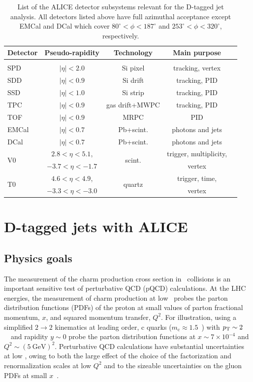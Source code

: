 \documentclass[12pt, a4paper, twoside, titlepage]{article}
\begin{document}
\begin{table}[bt]
\centering
\begin{tabular}{lcccc}
Detector		& Pseudo-rapidity		& Technology			& Main purpose			\\
\hline 
\hline
\\
SPD			& $\lvert \eta\rvert <2.0$	& Si pixel				& tracking, vertex		\\
SDD			& $\lvert \eta\rvert <0.9$ 	& Si drift				& tracking, PID			\\
SSD			& $\lvert \eta\rvert <1.0$ 	& Si strip				& tracking, PID			\\
TPC 			& $\lvert \eta\rvert <0.9$ 	& gas drift+MWPC		& tracking, PID			\\
TOF			& $\lvert \eta\rvert <0.9$	& MRPC				& PID				\\
EMCal		& $\lvert \eta\rvert <0.7$ 	& Pb+scint. 			& photons and jets		\\
DCal			& $\lvert \eta\rvert <0.7$ 	& Pb+scint. 			& photons and jets		\\
\multirow{2}{*}{V0}& $2.8 <\eta< 5.1$,	&\multirow{2}{*}{scint.}	& trigger, multiplicity,		\\
			& $-3.7 <\eta<-1.7$		&					& vertex				\\
\multirow{2}{*}{T0}& $4.6 <\eta< 4.9$,	&\multirow{2}{*}{quartz}	& trigger, time,			\\
			& $-3.3 <\eta<-3.0$		&					& vertex				\\
\end{tabular}
\caption{List of the ALICE detector subsystems relevant for the D-tagged jet analysis. All detectors listed above have full azimuthal acceptance except EMCal and DCal 
which cover $80^{\circ} <\phi< 187^{\circ}$ and $253^{\circ} <\phi< 320^{\circ}$, respectively.
\label{tab:ALICEdetectors}}
\end{table}

\section{D-tagged jets with ALICE}
\subsection{Physics goals}
The measurement of the charm production cross section in \pp\ collisions is an important sensitive test of perturbative QCD (pQCD) calculations.
At the LHC energies, the measurement of charm production at low \pt\ probes the parton distribution functions (PDFs)
of the proton at small values of parton fractional momentum, $x$, and squared momentum transfer, $Q^2$.
For illustration, using a simplified $2 \rightarrow 2$ kinematics at leading order, c quarks ($m_{\mathrm{c}} \approx 1.5$~\GeVcsq) with
$p_{\rm T} \sim 2$~\GeVc\ and rapidity $y \sim 0$ probe the parton distribution functions at $x \sim 7 \times 10^{-4}$ and
$Q^2 \sim (5~\mathrm{GeV})^2$.
Perturbative QCD calculations have substantial uncertainties at low \pt, owing to both the large effect of the
choice of the factorization and renormalization scales at low $Q^2$ and to the sizeable uncertainties on the
gluon PDFs at small $x$~\cite{Cacciari:2015}. 
\end{document}
